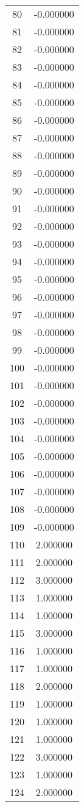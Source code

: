 \documentclass[12pt]{article}
\begin{document}
\begin{longtable}{@{}cc@{}}
80 & -0.000000 \\
81 & -0.000000 \\
82 & -0.000000 \\
83 & -0.000000 \\
84 & -0.000000 \\
85 & -0.000000 \\
86 & -0.000000 \\
87 & -0.000000 \\
88 & -0.000000 \\
89 & -0.000000 \\
90 & -0.000000 \\
91 & -0.000000 \\
92 & -0.000000 \\
93 & -0.000000 \\
94 & -0.000000 \\
95 & -0.000000 \\
96 & -0.000000 \\
97 & -0.000000 \\
98 & -0.000000 \\
99 & -0.000000 \\
100 & -0.000000 \\
101 & -0.000000 \\
102 & -0.000000 \\
103 & -0.000000 \\
104 & -0.000000 \\
105 & -0.000000 \\
106 & -0.000000 \\
107 & -0.000000 \\
108 & -0.000000 \\
109 & -0.000000 \\
110 & 2.000000 \\
111 & 2.000000 \\
112 & 3.000000 \\
113 & 1.000000 \\
114 & 1.000000 \\
115 & 3.000000 \\
116 & 1.000000 \\
117 & 1.000000 \\
118 & 2.000000 \\
119 & 1.000000 \\
120 & 1.000000 \\
121 & 1.000000 \\
122 & 3.000000 \\
123 & 1.000000 \\
124 & 2.000000 \\

\end{longtable}
\end{document}
